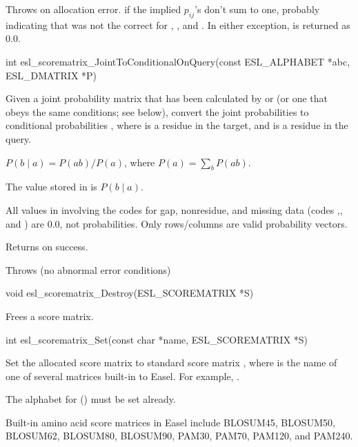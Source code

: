 \begin{sreapi}
Throws  on allocation error. 
 if the implied $p_{ij}$'s don't sum to one,
probably indicating that  was not the correct
 for , , and .
In either exception,  is returned as 0.0.


\hypertarget{func:esl_scorematrix_JointToConditionalOnQuery()}
{\item[int esl\_scorematrix\_JointToConditionalOnQuery(const ESL\_ALPHABET *abc, ESL\_DMATRIX *P)]}

Given a joint probability matrix  that has been calculated
by  or 
(or one that obeys the same conditions; see below), 
convert the joint probabilities  to conditional 
probabilities , where  is a residue in the target,
and  is a residue in the query.

$P(b \mid a) = P(ab) / P(a)$, where $P(a) = \sum_b P(ab)$.

The value stored in  is $P(b \mid a)$.

All values in  involving the codes for gap,
nonresidue, and missing data (codes ,, and
) are 0.0, not probabilities. Only rows/columns
 are valid probability vectors.

Returns  on success.

Throws (no abnormal error conditions)



\hypertarget{func:esl_scorematrix_Destroy()}
{\item[void esl\_scorematrix\_Destroy(ESL\_SCOREMATRIX *S)]}

Frees a score matrix.


\hypertarget{func:esl_scorematrix_Set()}
{\item[int esl\_scorematrix\_Set(const char *name, ESL\_SCOREMATRIX *S)]}

Set the allocated score matrix  to standard score
matrix , where  is the name of one of
several matrices built-in to Easel. For example,
.

The alphabet for  () must be set already.

Built-in amino acid score matrices in Easel include
BLOSUM45, BLOSUM50, BLOSUM62, BLOSUM80, BLOSUM90, PAM30,
PAM70, PAM120, and PAM240.


\end{sreapi}
